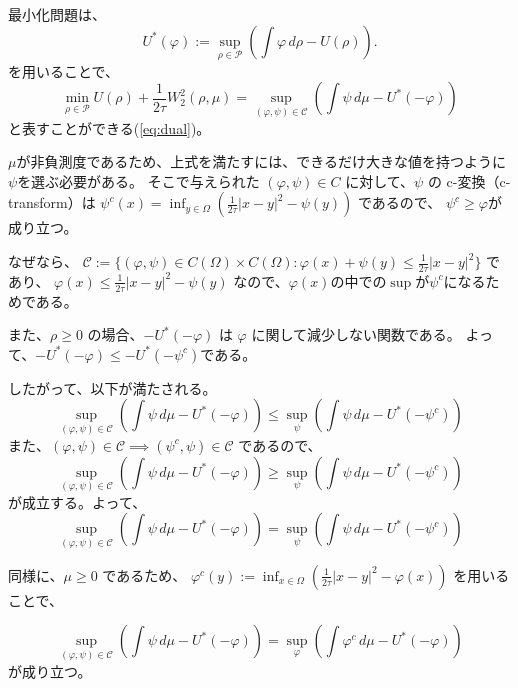 最小化問題は、
\[
    U^*(\varphi) := \sup_{\rho \in \mathcal{P}} \left(\int \varphi \, d\rho - U(\rho) \right).
\]
を用いることで、
\begin{equation*}
    \min_{\rho \in \mathcal{P}} U(\rho) + \frac{1}{2\tau} W_2^2(\rho, \mu) = \sup_{(\varphi, \psi) \in \mathcal{C}} \left(\int \psi \, d\mu - U^*(- \varphi)\right)
\end{equation*}
と表すことができる(\ref{eq:dual})。

$\mu$が非負測度であるため、上式を満たすには、できるだけ大きな値を持つように$\psi$を選ぶ必要がある。
そこで与えられた \((\varphi, \psi) \in C\) に対して、\(\psi\) の c-変換（c-transform）は
$
    \psi^c(x) = \inf_{y \in \Omega} \left( \frac{1}{2\tau}|x-y|^2 - \psi(y)\right)
$
であるので、
\(\psi^c \geq \varphi\)が成り立つ。


なぜなら、
$
    \mathcal{C}  := \{(\varphi, \psi) \in C(\Omega) \times C(\Omega) : \varphi(x) + \psi(y) \leq \frac{1}{2 \tau} |x - y|^2 \}
$
であり、
$
  \varphi(x) \le \frac{1}{2\tau}|x-y|^2 - \psi(y)
$
なので、$\varphi(x)$の中での$\sup$が$\psi^c$になるためである。

また、\(\rho \geq 0\) の場合、\(- U^*(-\varphi)\) は \(\varphi\) に関して減少しない関数である。
よって、$-U^*(- \varphi) \le -U^*(- \psi^c)$である。


したがって、以下が満たされる。
\[
\sup_{(\varphi, \psi) \in \mathcal{C}} \left(\int \psi \, d\mu - U^*(- \varphi)\right) \le \sup_\psi \left(\int \psi \, d\mu - U^*(- \psi^c)\right)
\]
また、$(\varphi, \psi) \in \mathcal{C} \implies (\psi^c, \psi) \in \mathcal{C}$
であるので、
\[
\sup_{(\varphi, \psi) \in \mathcal{C}} \left(\int \psi \, d\mu - U^*(- \varphi)\right) \ge \sup_\psi \left(\int \psi \, d\mu - U^*(- \psi^c)\right)
\]
が成立する。よって、
\begin{equation}
  \label{eq:psi^c}
\sup_{(\varphi, \psi) \in \mathcal{C}} \left(\int \psi \, d\mu - U^*(- \varphi)\right) = \sup_\psi \left(\int \psi \, d\mu - U^*(- \psi^c)\right)
\end{equation}

同様に、\(\mu \geq 0\) であるため、
$
    \varphi^c(y) := \inf_{x \in \Omega} \left( \frac{1}{2\tau}|x-y|^2 - \varphi(x)\right)
$
を用いることで、

\begin{equation}
  \label{eq:phi^c}
  \sup_{(\varphi, \psi) \in \mathcal{C}} \left(\int \psi \, d\mu - U^*(- \varphi)\right) = \sup_\varphi \left(\int \varphi^c \, d\mu - U^*(- \varphi)\right)
\end{equation}
が成り立つ。

